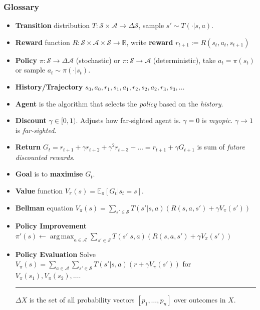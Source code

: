 \documentclass[10pt,a4paper]{beamer}
\renewcommand{\S}{\mathcal{S}}
\newcommand{\A}{\mathcal{A}}
\DeclareMathOperator*{\argmax}{arg\,max}
\begin{document}
\begin{frame}
	\small{
    \frametitle{Glossary}
    \begin{itemize}
        \item \textbf{Transition} distribution $T : \S \times \A \to \Delta \S$, sample $s' \sim T(\cdot | s,a)$.
        \item \textbf{Reward} function $R : \S \times \A \times \S \to \mathbb{R}$, write \textbf{reward} $r_{t+1} := R(s_t, a_t, s_{t+1})$
        \item \textbf{Policy} $\pi : \S \to \Delta \A$ (stochastic) or $\pi : \S \to \A$ (deterministic), take $a_{t} = \pi(s_t)$ or sample $a_{t} \sim \pi(\cdot | s_t)$.
        \item \textbf{History/Trajectory}
        $
        s_0, a_0, r_1, s_1, a_1, r_2, s_2, a_2, r_3, s_3, \ldots
        $
        \item \textbf{Agent} is the algorithm that selects the \textit{policy} based on the \textit{history}.
        \item \textbf{Discount} $\gamma \in [0,1)$. Adjusts how far-sighted agent is. $\gamma = 0$ is \emph{myopic}. $\gamma \to 1$ is \emph{far-sighted}.
        \item \textbf{Return} $G_t = r_{t+1} + \gamma r_{t+2} + \gamma^2 r_{t+3} + \ldots = r_{t+1} + \gamma G_{t+1}$ is sum of \textit{future discounted rewards}.
        \item \textbf{Goal} is to \textbf{maximise} $G_t$.
        \item \textbf{Value} function $V_{\pi}(s) = \mathbb{E}_\pi [ G_t | s_t = s]$.
        \item \textbf{Bellman} equation 
        $
        V_\pi(s) = \sum_{s' \in \S} T(s' | s, a) \left( R(s,a,s') + \gamma V_\pi(s') \right) 
        $ 
		\item \textbf{Policy Improvement}
			$
			\pi'(s) \leftarrow \argmax_{a \in \A} \sum_{s' \in \S} T(s' | s,a) 
			\left( R(s,a,s') + \gamma V_{\pi}(s') \right)
			$
		\item \textbf{Policy Evaluation}
			Solve
			$
			V_\pi(s) = \sum_{a \in \A} \sum_{s' \in \S} T(s' | s, a) \left( r + \gamma V_\pi(s') \right) 
			$ for $V_\pi(s_1), V_\pi(s_2), \ldots$.
        
        \hspace{0pt}
        \rule{0.3\textwidth}{0.5pt}
        \vspace{0.1cm}
        
        
        \footnotesize{$\Delta X$ is the set of all probability vectors $[p_1, \ldots, p_n]$ over outcomes in $X$.}
    \end{itemize}
	}
\end{frame}
\end{document}

